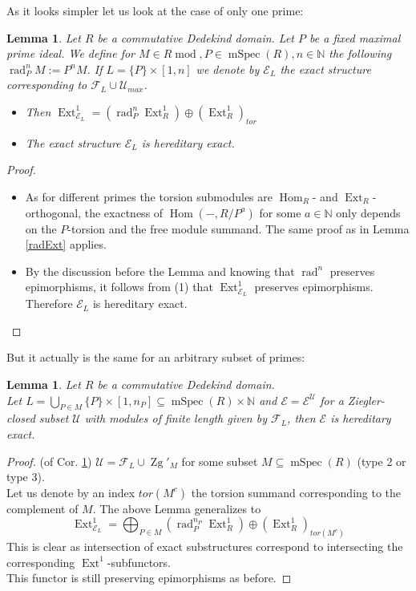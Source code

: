\documentclass[11pt,a4paper]{amsart}
\theoremstyle{plain}
\newtheorem{lem}[thm]{Lemma}
\theoremstyle{definition}
\DeclareMathOperator{\Hom}{Hom}
\DeclareMathOperator{\Ext}{Ext}
\DeclareMathOperator{\modu}{mod}
\newcommand{\mcE}{\mathcal{E}}
\newcommand{\mcF}{\mathcal{F}}
\newcommand{\mcU}{\mathcal{U}}
\DeclareMathOperator{\rad}{rad}
\DeclareMathOperator{\Zg}{Zg}
\DeclareMathOperator{\mSpec}{mSpec}
\begin{document}
As it looks simpler let us look at the case of only one prime:
\begin{lem} \label{P-rad} Let $R$ be a commutative Dedekind domain. Let $P$ be a fixed maximal prime ideal. We define for $M \in R\modu, P \in \mSpec (R), n \in \mathbb{N}$ the following $\rad_P^n M:= P^nM$. If $L=\{P\} \times [1,n]$ we denote by $\mcE_L$ the exact structure corresponding to $\mcF_L \cup \mcU_{max}$. 
\begin{itemize}
\item[(1)]    
Then $\Ext^1_{\mcE_L}=(\rad_P^n \Ext^1_R)\oplus (\Ext^1_R)_{tor}$
\item[(2)] The exact structure $\mcE_L$ is hereditary exact. 
\end{itemize}
\end{lem}

\begin{proof}
\begin{itemize}
\item[(1)]
As for different primes the torsion submodules are $\Hom_R$- and $\Ext_R$-orthogonal, the exactness of $\Hom(-,R/P^a)$ for some $a\in \mathbb{N}$ only depends on the $P$-torsion and the free module summand. The same proof as in Lemma \ref{radExt} applies.    
\item[(2)] By the discussion before the Lemma and knowing that $\rad^n$ preserves epimorphisms, it follows from (1) that $\Ext^1_{\mcE_L}$ preserves epimorphisms. Therefore $\mcE_L$ is hereditary exact. 
\end{itemize}
\end{proof}

But it actually is the same for an arbitrary subset of primes: 
\begin{lem} \label{herSubstr} Let $R$ be a commutative Dedekind domain. \\
Let $L=\bigcup_{P\in M} \{P\} \times [1,n_P]\subseteq \mSpec (R) \times \mathbb{N}$  and $\mcE=\mcE^{\mcU}$ for a Ziegler-closed subset $\mcU$ with modules of finite length given by $\mcF_L$, then $\mcE$ is hereditary exact. 
\end{lem}
\begin{proof} (of Cor. \ref{herSubstr}) $\mcU=\mcF_L \cup \Zg'_M$ for some subset $M\subseteq \mSpec (R)$ (type 2 or type 3). \\
Let us denote by an index $tor(M^c)$ the torsion summand corresponding to the complement of $M$. The above Lemma generalizes to 
\[\Ext^1_{\mcE_L}=\bigoplus_{P \in M} (\rad_P^{n_P} \Ext^1_R)\oplus (\Ext^1_R)_{tor (M^c)}\]
This is clear as intersection of exact substructures correspond to intersecting the corresponding $\Ext^1$-subfunctors. \\
This functor is still preserving epimorphisms as before. 
\end{proof}    
\end{document}
